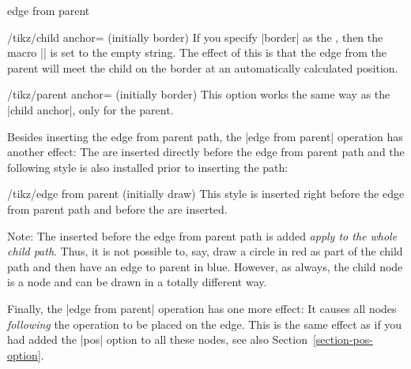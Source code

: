 \begin{pathoperation}{edge from parent}{}
\begin{key}{/tikz/child anchor= (initially border)}
    If you specify |border| as the , then the macro
    |\tikzchildanchor| is set to the empty string. The effect of
    this is that the edge from the parent will meet the child on the
    border at an automatically calculated position.
\begin{codeexample}[]
\end{codeexample}
  \end{key}

  \begin{key}{/tikz/parent anchor= (initially border)}
    This option works the same way as the |child anchor|, only for
    the parent.
  \end{key}

  Besides inserting the edge from parent path, the |edge from parent|
  operation has another effect: The  are inserted
  directly before the edge from parent path and the following style is
  also installed prior to inserting the path:
  \begin{stylekey}{/tikz/edge from parent (initially draw)}
    This style is inserted right before the edge from parent path and
    before the  are inserted. 
\begin{codeexample}[]
\end{codeexample}
  \end{stylekey}

  Note: The  inserted before the edge from parent path
  is added \emph{apply to the whole child path}. Thus, it is not
  possible to, say, draw a circle in red as part of the child path and
  then have an edge to parent in blue. However, as always, the child
  node is a node and can be drawn in a totally different way.

  Finally, the |edge from parent| operation has one more effect: It
  causes all nodes \emph{following} the operation to be placed on the
  edge. This is the same effect as if you had added the |pos| option
  to all these nodes, see also Section~\ref{section-pos-option}.


\end{pathoperation}
